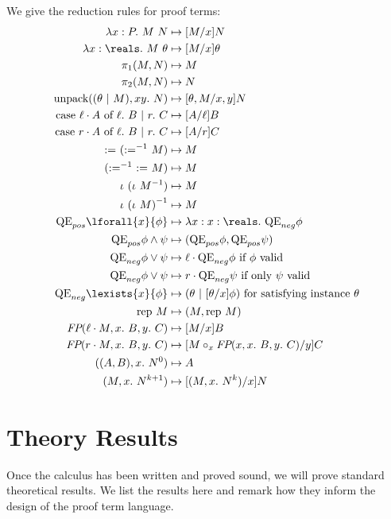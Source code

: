 \documentclass[12pt]{cmuthesis}
\theoremstyle{definition}
\theoremstyle{remark}
\newcommand{\stepsto}{\mapsto}
\begin{document}
\newcommand{\esub}[3]{[#3/#2]#1}
We give the reduction rules for proof terms:
\begin{align*}
\eapp{\elam{P}{M}}{N} &\stepsto \esub{N}{x}{M}\\
\eapp{\elam{\reals}{M}}{\theta} &\stepsto \esub{\theta}{x}{M}\\
\eprojL{(M,N)} &\stepsto M\\
\eprojR{(M,N)} &\stepsto N\\
\eunpack{\etcons{\theta}{M}}{N} &\stepsto \esub{N}{x,y}{\theta,M}\\
\ecase{\einjL{A}}{B}{C} &\stepsto \esub{B}{\ell}{A}\\
\ecase{\einjR{A}}{B}{C} &\stepsto \esub{C}{r}{A}\\
\easgn{\easgninv{M}} &\stepsto M\\
\easgninv{\easgn{M}} &\stepsto M\\
\eseq{(\eseqinv{M})} &\stepsto M\\
\eseqinv{(\eseq{M})} &\stepsto M\\
\eQEpos{\lforall{x}{\phi}} &\stepsto \elam{x:\reals}{\eQEneg{\phi}}\\
\eQEpos{\phi \land \psi} &\stepsto \econs{\eQEpos{\phi}}{\eQEpos{\psi}}\\
\eQEneg{\phi \lor \psi} &\stepsto \einjL{\eQEneg{\phi}} \text{ if $\phi$ valid}\\
\eQEneg{\phi \lor \psi} &\stepsto \einjR{\eQEneg{\psi}} \text{ if only $\psi$ valid}\\
\eQEneg{\lexists{x}{\phi}} &\stepsto \etcons{\theta}{\esub{\phi}{x}{\theta}} \text{ for satisfying instance }\theta\\
\erep{M} &\stepsto \econs{M}{\erep{M}}\\
\efp{\einjL{M}}{B}{C} &\stepsto \esub{B}{x}{M}\\
\efp{\einjR{M}}{B}{C} &\stepsto \esub{C}{y}{\emon{M}{\efp{x}{B}{C}}{x}}\\
\eloopelim{\econs{A}{B}}{N}{0} &\stepsto A\\
\eloopelim{M}{N}{k+1} &\stepsto \esub{N}{x}{\eloopelim{M}{N}{k}}
\end{align*}

\section{Theory Results}
Once the calculus has been written and proved sound, we will prove standard theoretical results.
We list the results here and remark how they inform the design of the proof term language.
\end{document}
